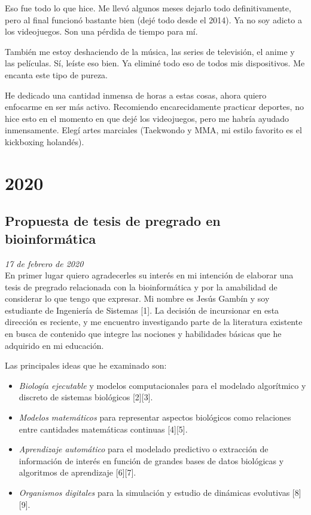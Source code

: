 \documentclass[12pt]{article}
\begin{document}
	Eso fue todo lo que hice. Me llevó algunos meses dejarlo todo
	definitivamente, pero al final funcionó bastante bien (dejé todo desde
	el 2014). Ya no soy adicto a los videojuegos. Son una pérdida de
	tiempo para mí.

	También me estoy deshaciendo de la música, las series de televisión, el
	anime y las películas. Sí, leíste eso bien. Ya eliminé todo eso de todos
	mis dispositivos. Me encanta este tipo de pureza.

	He dedicado una cantidad inmensa de horas a estas cosas, ahora quiero
	enfocarme en ser más activo. Recomiendo encarecidamente practicar
	deportes, no hice esto en el momento en que dejé los videojuegos, pero
	me habría ayudado inmensamente. Elegí artes marciales (Taekwondo y MMA,
	mi estilo favorito es el kickboxing holandés).

	\newpage

	\section{2020}

	\subsection{Propuesta de tesis de pregrado en bioinformática}

	\textit{17 de febrero de 2020}\\

	En primer lugar quiero agradecerles su interés en mi intención de
	elaborar una tesis de pregrado relacionada con la bioinformática y por
	la amabilidad de considerar lo que tengo que expresar. Mi nombre es
	Jesús Gambín y soy estudiante de Ingeniería de Sistemas [1]. La
	decisión de incursionar en esta dirección es reciente, y me encuentro
	investigando parte de la literatura existente en busca de contenido que
	integre las nociones y habilidades básicas que he adquirido en mi
	educación.

	Las principales ideas que he examinado son:

	\begin{itemize}
	\item
		\textit{Biología ejecutable} y modelos computacionales para el
		modelado algorítmico y discreto de sistemas biológicos [2][3].
	\item
		\textit{Modelos matemáticos} para representar aspectos
		biológicos como relaciones entre cantidades matemáticas
		continuas [4][5].
	\item
		\textit{Aprendizaje automático} para el modelado predictivo o
		extracción de información de interés en función de grandes
		bases de datos biológicas y algoritmos de aprendizaje [6][7].
	\item
		\textit{Organismos digitales} para la simulación y estudio de
		dinámicas evolutivas [8][9].
	\end{itemize}
\end{document}
